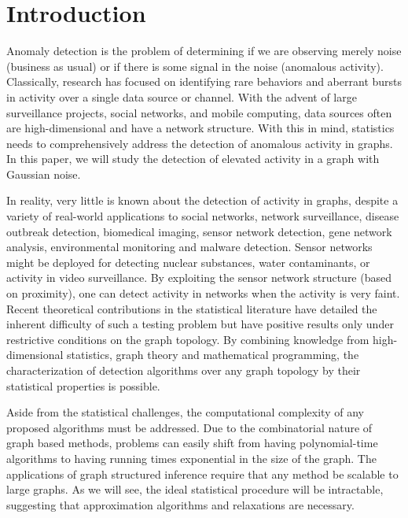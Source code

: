 \vspace{-.2cm}
\section{Introduction}
\vspace{-.2cm}
Anomaly detection is the problem of determining if we are observing merely noise (business as usual) or if there is some signal in the noise (anomalous activity).
Classically, research has focused on identifying rare behaviors and aberrant bursts in activity over a single data source or channel.
With the advent of large surveillance projects, social networks, and mobile computing, data sources often are high-dimensional and have a network structure. 
With this in mind, statistics needs to comprehensively address the detection of anomalous activity in graphs.
In this paper, we will study the detection of elevated activity in a graph with Gaussian noise.

In reality, very little is known about the detection of activity in graphs, despite a variety of real-world applications to social networks, network surveillance, disease outbreak detection, biomedical imaging, sensor network detection, gene network analysis, environmental monitoring and malware detection.
Sensor networks might be deployed for detecting nuclear substances, water contaminants, or activity in video surveillance.
By exploiting the sensor network structure (based on proximity), one can detect activity in networks when the activity is very faint.
Recent theoretical contributions in the statistical literature\cite{arias2011detection,addario2010combinatorial} have detailed the inherent difficulty of such a testing problem but have positive results only under restrictive conditions on the graph topology.
By combining knowledge from high-dimensional statistics, graph theory and mathematical programming, the characterization of detection algorithms over any graph topology by their statistical properties is possible.

Aside from the statistical challenges, the computational complexity of any proposed algorithms must be addressed.
Due to the combinatorial nature of graph based methods, problems can easily shift from having polynomial-time algorithms to having running times exponential in the size of the graph.
The applications of graph structured inference require that any method be scalable to large graphs.
As we will see, the ideal statistical procedure will be intractable, suggesting that approximation algorithms and relaxations are necessary.

